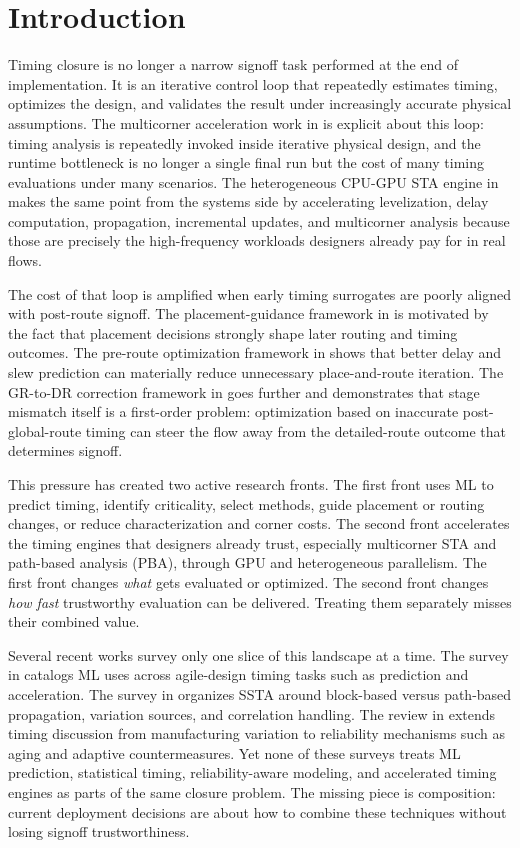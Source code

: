 \documentclass[num-refs]{wiley-article}
\begin{document}
    \section{Introduction}

    Timing closure is no longer a narrow signoff task performed at the end of implementation. It is an iterative control loop that repeatedly estimates timing, optimizes the design, and validates the result under increasingly accurate physical assumptions. The multicorner acceleration work in \cite{ref16} is explicit about this loop: timing analysis is repeatedly invoked inside iterative physical design, and the runtime bottleneck is no longer a single final run but the cost of many timing evaluations under many scenarios. The heterogeneous CPU-GPU STA engine in \cite{ref22} makes the same point from the systems side by accelerating levelization, delay computation, propagation, incremental updates, and multicorner analysis because those are precisely the high-frequency workloads designers already pay for in real flows.


    The cost of that loop is amplified when early timing surrogates are poorly aligned with post-route signoff. The placement-guidance framework in \cite{ref1} is motivated by the fact that placement decisions strongly shape later routing and timing outcomes. The pre-route optimization framework in \cite{ref17} shows that better delay and slew prediction can materially reduce unnecessary place-and-route iteration. The GR-to-DR correction framework in \cite{ref10} goes further and demonstrates that stage mismatch itself is a first-order problem: optimization based on inaccurate post-global-route timing can steer the flow away from the detailed-route outcome that determines signoff.


    This pressure has created two active research fronts. The first front uses ML to predict timing, identify criticality, select methods, guide placement or routing changes, or reduce characterization and corner costs. The second front accelerates the timing engines that designers already trust, especially multicorner STA and path-based analysis (PBA), through GPU and heterogeneous parallelism. The first front changes \emph{what} gets evaluated or optimized. The second front changes \emph{how fast} trustworthy evaluation can be delivered. Treating them separately misses their combined value.


    Several recent works survey only one slice of this landscape at a time. The survey in \cite{ref20} catalogs ML uses across agile-design timing tasks such as prediction and acceleration. The survey in \cite{ref49} organizes SSTA around block-based versus path-based propagation, variation sources, and correlation handling. The review in \cite{ref39} extends timing discussion from manufacturing variation to reliability mechanisms such as aging and adaptive countermeasures. Yet none of these surveys treats ML prediction, statistical timing, reliability-aware modeling, and accelerated timing engines as parts of the same closure problem. The missing piece is composition: current deployment decisions are about how to combine these techniques without losing signoff trustworthiness.
\end{document}
